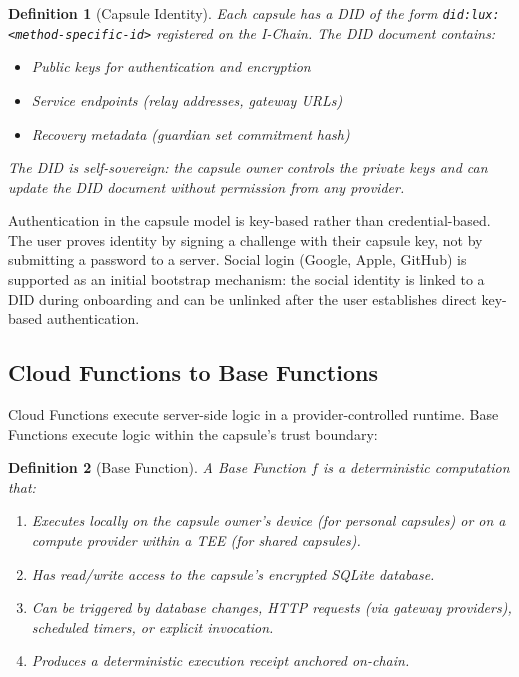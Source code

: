 \documentclass[11pt,a4paper]{article}
\newtheorem{definition}{Definition}
\begin{document}
\begin{definition}[Capsule Identity]
Each capsule has a DID of the form \texttt{did:lux:<method-specific-id>}
registered on the I-Chain. The DID document contains:
\begin{itemize}
    \item Public keys for authentication and encryption
    \item Service endpoints (relay addresses, gateway URLs)
    \item Recovery metadata (guardian set commitment hash)
\end{itemize}
The DID is self-sovereign: the capsule owner controls the private keys
and can update the DID document without permission from any provider.
\end{definition}

Authentication in the capsule model is key-based rather than
credential-based. The user proves identity by signing a challenge
with their capsule key, not by submitting a password to a server.
Social login (Google, Apple, GitHub) is supported as an initial
bootstrap mechanism: the social identity is linked to a DID during
onboarding and can be unlinked after the user establishes direct
key-based authentication.

\subsection{Cloud Functions to Base Functions}

Cloud Functions execute server-side logic in a provider-controlled
runtime. Base Functions execute logic within the capsule's trust
boundary:

\begin{definition}[Base Function]
A Base Function $f$ is a deterministic computation that:
\begin{enumerate}
    \item Executes locally on the capsule owner's device (for personal capsules)
    or on a compute provider within a TEE (for shared capsules).
    \item Has read/write access to the capsule's encrypted SQLite database.
    \item Can be triggered by database changes, HTTP requests (via gateway
    providers), scheduled timers, or explicit invocation.
    \item Produces a deterministic execution receipt anchored on-chain.
\end{enumerate}
\end{definition}
\end{document}
